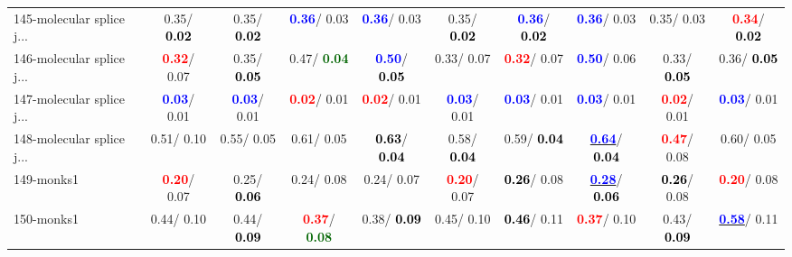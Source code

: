 \begin{table}[h]
\begin{center}
{\begin{tabular}{lc|c|c|c|c|c|c|c|c}
145-molecular splice j... &   0.35/\textcolor{black}{\textbf{  0.02}} &   0.35/\textcolor{black}{\textbf{  0.02}} & \textcolor{blue}{\textbf{  0.36}}/  0.03 & \textcolor{blue}{\textbf{  0.36}}/  0.03 &   0.35/\textcolor{black}{\textbf{  0.02}} & \textcolor{blue}{\textbf{  0.36}}/\textcolor{black}{\textbf{  0.02}} & \textcolor{blue}{\textbf{  0.36}}/  0.03 &   0.35/  0.03 & \textcolor{red}{\textbf{  0.34}}/\textcolor{black}{\textbf{  0.02}} \\
146-molecular splice j... & \textcolor{red}{\textbf{  0.32}}/  0.07 &   0.35/\textcolor{black}{\textbf{  0.05}} &   0.47/\textcolor{darkgreen}{\textbf{  0.04}} & \textcolor{blue}{\textbf{  0.50}}/\textcolor{black}{\textbf{  0.05}} &   0.33/  0.07 & \textcolor{red}{\textbf{  0.32}}/  0.07 & \textcolor{blue}{\textbf{  0.50}}/  0.06 &   0.33/\textcolor{black}{\textbf{  0.05}} &   0.36/\textcolor{black}{\textbf{  0.05}} \\
147-molecular splice j... & \textcolor{blue}{\textbf{  0.03}}/  0.01 & \textcolor{blue}{\textbf{  0.03}}/  0.01 & \textcolor{red}{\textbf{  0.02}}/  0.01 & \textcolor{red}{\textbf{  0.02}}/  0.01 & \textcolor{blue}{\textbf{  0.03}}/  0.01 & \textcolor{blue}{\textbf{  0.03}}/  0.01 & \textcolor{blue}{\textbf{  0.03}}/  0.01 & \textcolor{red}{\textbf{  0.02}}/  0.01 & \textcolor{blue}{\textbf{  0.03}}/  0.01 \\
148-molecular splice j... &   0.51/  0.10 &   0.55/  0.05 &   0.61/  0.05 & \textcolor{black}{\textbf{  0.63}}/\textcolor{black}{\textbf{  0.04}} &   0.58/\textcolor{black}{\textbf{  0.04}} &   0.59/\textcolor{black}{\textbf{  0.04}} & \underline{\textcolor{blue}{\textbf{  0.64}}}/\textcolor{black}{\textbf{  0.04}} & \textcolor{red}{\textbf{  0.47}}/  0.08 &   0.60/  0.05 \\
149-monks1 & \textcolor{red}{\textbf{  0.20}}/  0.07 &   0.25/\textcolor{black}{\textbf{  0.06}} &   0.24/  0.08 &   0.24/  0.07 & \textcolor{red}{\textbf{  0.20}}/  0.07 & \textcolor{black}{\textbf{  0.26}}/  0.08 & \underline{\textcolor{blue}{\textbf{  0.28}}}/\textcolor{black}{\textbf{  0.06}} & \textcolor{black}{\textbf{  0.26}}/  0.08 & \textcolor{red}{\textbf{  0.20}}/  0.08 \\ \hline
150-monks1 &   0.44/  0.10 &   0.44/\textcolor{black}{\textbf{  0.09}} & \textcolor{red}{\textbf{  0.37}}/\textcolor{darkgreen}{\textbf{  0.08}} &   0.38/\textcolor{black}{\textbf{  0.09}} &   0.45/  0.10 & \textcolor{black}{\textbf{  0.46}}/  0.11 & \textcolor{red}{\textbf{  0.37}}/  0.10 &   0.43/\textcolor{black}{\textbf{  0.09}} & \underline{\textcolor{blue}{\textbf{  0.58}}}/  0.11 \\

\end{tabular}}
\end{center}
\end{table}
